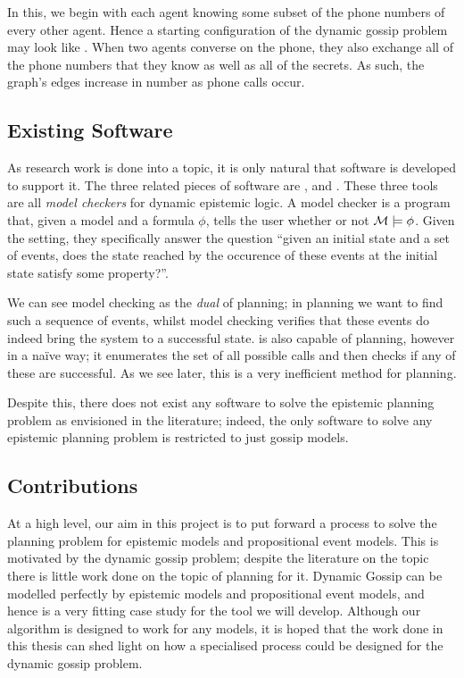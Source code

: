 \documentclass[12pt, a4paper]{article}
\begin{document}
In this, we begin with each agent knowing some subset of the phone
numbers of every other agent. Hence a starting configuration of the dynamic
gossip problem may look like . When two agents
converse on the phone, they also exchange all of the phone numbers that they
know as well as all of the secrets. As such, the graph's edges increase in
number as phone calls occur.

\subsection{Existing Software}

As research work is done into a topic, it is only natural that software is
developed to support it. The three related pieces of software are
\cite{DEMO-S5}, \cite{SMCDEL} and \cite{GithubGossip}. These three tools are all
\textit{model checkers} for dynamic epistemic logic. A model checker is a
program that, given a model  and a formula $\phi$, tells the user whether
or not $\mathcal{M} \models \phi$. Given the setting, they specifically answer the
question ``given an initial state and a set of events, does the state reached by
the occurence of these events at the initial state satisfy some property?''.

We can see model checking as the \textit{dual} of planning; in planning we want
to find such a sequence of events, whilst model checking verifies that these
events do indeed bring the system to a successful state. \cite{GithubGossip} is
also capable of planning, however in a na{\"i}ve way; it enumerates the set of
all possible calls and then checks if any of these are successful. As we see
later, this is a very inefficient method for planning. 

Despite this, there does not exist any software to solve the epistemic planning
problem as envisioned in the literature; indeed, the only software to solve any
epistemic planning problem is restricted to just gossip models.

\subsection{Contributions}

At a high level, our aim in this project is to put forward a process to solve
the planning problem for epistemic models and propositional event models. This
is motivated by the dynamic gossip problem; despite the literature on the topic
there is little work done on the topic of planning for it. Dynamic Gossip can be
modelled perfectly by epistemic models and propositional event models, and hence
is a very fitting case study for the tool we will develop. Although our
algorithm is designed to work for any models, it is hoped that the work done in
this thesis can shed light on how a specialised process could be designed for
the dynamic gossip problem.
\end{document}
